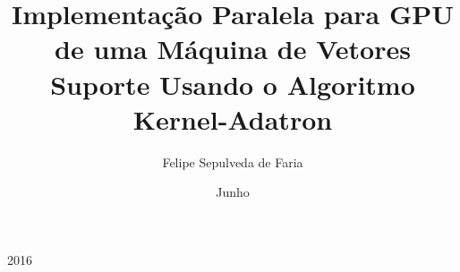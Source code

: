 \documentclass{projetofinal-dcc}
\begin{document}
\title{Implementação Paralela para GPU de uma Máquina de Vetores Suporte Usando o Algoritmo Kernel-Adatron}

\author{Felipe Sepulveda de Faria}{}





\date{Junho}{2016}
\maketitle

\startdocument
\makethankspage

\begin{abstract}{
  
}
\end{abstract}

\begin{englishabstract}{
  
}
\end{englishabstract}

\makefigurespage

\maketablespage

\makealgorithmspage
\end{document}
